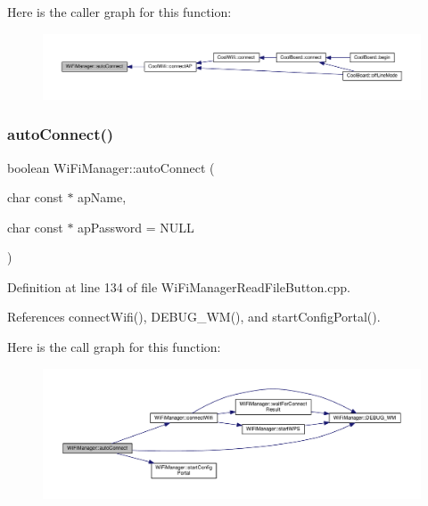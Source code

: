 Here is the caller graph for this function\+:\nopagebreak
\begin{figure}[H]
\begin{center}
\leavevmode
\includegraphics[width=350pt]{d4/dc8/class_wi_fi_manager_ae3cdfa6b02edcfe63d7da4f696b62136_icgraph}
\end{center}
\end{figure}
\mbox{\label{class_wi_fi_manager_ab1d094034e5e3e36e2e1b3624edad469}} 
\subsubsection{\texorpdfstring{auto\+Connect()}{autoConnect()}\hspace{0.1cm}{\footnotesize\ttfamily [2/2]}}
{\footnotesize\ttfamily boolean Wi\+Fi\+Manager\+::auto\+Connect (\begin{DoxyParamCaption}\item[{char const $\ast$}]{ap\+Name,  }\item[{char const $\ast$}]{ap\+Password = {\ttfamily NULL} }\end{DoxyParamCaption})}



Definition at line 134 of file Wi\+Fi\+Manager\+Read\+File\+Button.\+cpp.



References connect\+Wifi(), D\+E\+B\+U\+G\+\_\+\+W\+M(), and start\+Config\+Portal().

Here is the call graph for this function\+:\nopagebreak
\begin{figure}[H]
\begin{center}
\leavevmode
\includegraphics[width=350pt]{d4/dc8/class_wi_fi_manager_ab1d094034e5e3e36e2e1b3624edad469_cgraph}
\end{center}
\end{figure}
\mbox{\label{class_wi_fi_manager_ad781751307f7f623956126096a09a545}} 

